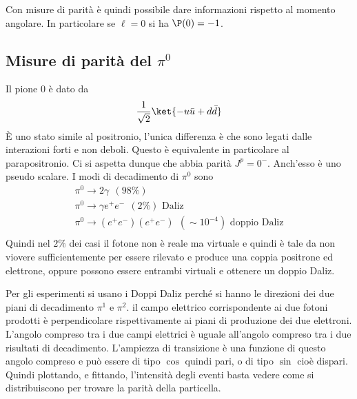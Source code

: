 \documentclass[12pt]{book}
\begin{document}
Con misure di parità è quindi possibile dare informazioni rispetto al momento angolare. In particolare se $\ell=0$ si ha $\P (0)=-1$. 




\subsection{Misure di parità del $\pi^0$}
Il pione 0 è dato da 
\begin{equation}
	\frac{1}{\sqrt{2}} \ket{- u \bar u + d \bar d} 
\end{equation}
È uno stato simile al positronio, l'unica differenza è che sono legati dalle interazioni forti e non deboli. Questo è equivalente in particolare al parapositronio. Ci si aspetta dunque che abbia parità $J^p=0^-$. Anch'esso è uno pseudo scalare. I modi di decadimento di $\pi^0$ sono
\begin{gather}
	\pi^0 \rightarrow 2 \gamma \ \ (98\%)\\
	\pi^0 \rightarrow \gamma e^+ e^- \ \ (2 \%) \text{ Daliz}\\
	\pi^0 \rightarrow (e^+e^-) (e^+ e^-) \ \ (\sim 10^{-4} ) \text{ doppio Daliz} \\
\end{gather}
Quindi nel $2 \%$ dei casi il fotone non è reale ma virtuale e quindi è tale da non viovere sufficientemente per essere rilevato e produce una coppia positrone ed elettrone, oppure possono essere entrambi virtuali e ottenere un doppio Daliz. 

Per gli esperimenti si usano i Doppi Daliz perché si hanno le direzioni dei due piani di decadimento $\pi^1$ e $\pi^2$. il campo elettrico corrispondente ai due fotoni prodotti è perpendicolare rispettivamente ai piani di produzione dei due elettroni. L'angolo compreso tra i due campi elettrici è uguale all'angolo compreso tra i due risultati di decadimento. L'ampiezza di transizione è una funzione di questo angolo compreso e può essere di tipo $\cos$ quindi pari, o di tipo $\sin$ cioè dispari. Quindi plottando, e fittando, l'intensità degli eventi basta vedere come si distribuiscono per trovare la parità della particella.


\newpage
\end{document}

